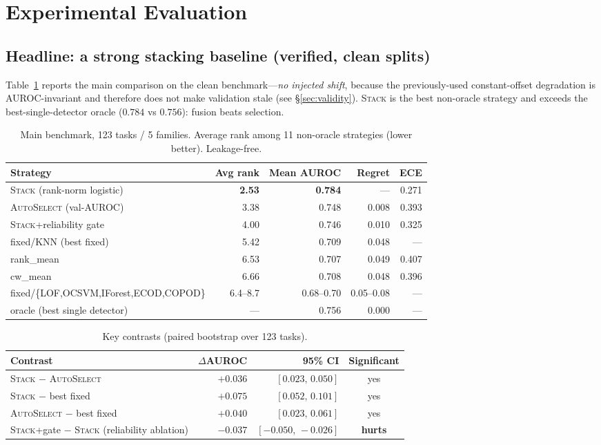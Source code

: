 \documentclass[11pt]{article}
\newcommand{\stack}{\textsc{Stack}}
\newcommand{\auto}{\textsc{AutoSelect}}
\begin{document}
\section{Experimental Evaluation}
\subsection{Headline: a strong stacking baseline (verified, clean splits)}
Table~\ref{tab:main} reports the main comparison on the clean benchmark---\emph{no
injected shift}, because the previously-used constant-offset degradation is
AUROC-invariant and therefore does not make validation stale (see
\S\ref{sec:validity}). \stack{} is the best non-oracle strategy and exceeds the
best-single-detector oracle ($0.784$ vs $0.756$): fusion beats selection.

\begin{table}[H]\centering
\caption{Main benchmark, 123 tasks / 5 families. Average rank among 11 non-oracle
strategies (lower better). Leakage-free.}
\label{tab:main}
\begin{tabular}{lrrrr}
\toprule
Strategy & Avg rank & Mean AUROC & Regret & ECE \\
\midrule
\stack{} (rank-norm logistic) & \textbf{2.53} & \textbf{0.784} & --- & 0.271 \\
\auto{} (val-AUROC) & 3.38 & 0.748 & 0.008 & 0.393 \\
\stack{}+reliability gate & 4.00 & 0.746 & 0.010 & 0.325 \\
fixed/KNN (best fixed) & 5.42 & 0.709 & 0.048 & --- \\
rank\_mean & 6.53 & 0.707 & 0.049 & 0.407 \\
cw\_mean & 6.66 & 0.708 & 0.048 & 0.396 \\
fixed/\{LOF,OCSVM,IForest,ECOD,COPOD\} & 6.4--8.7 & 0.68--0.70 & 0.05--0.08 & --- \\
\midrule
oracle (best single detector) & --- & 0.756 & 0.000 & --- \\
\bottomrule
\end{tabular}
\end{table}

\begin{table}[H]\centering
\caption{Key contrasts (paired bootstrap over 123 tasks).}
\label{tab:contrasts}
\begin{tabular}{lrrc}
\toprule
Contrast & $\Delta$AUROC & 95\% CI & Significant \\
\midrule
\stack{} $-$ \auto{}            & $+0.036$ & $[0.023,\,0.050]$ & yes \\
\stack{} $-$ best fixed         & $+0.075$ & $[0.052,\,0.101]$ & yes \\
\auto{} $-$ best fixed          & $+0.040$ & $[0.023,\,0.061]$ & yes \\
\stack{}+gate $-$ \stack{} (reliability ablation) & $-0.037$ & $[-0.050,\,-0.026]$ & \textbf{hurts} \\
\bottomrule
\end{tabular}
\end{table}
\end{document}
